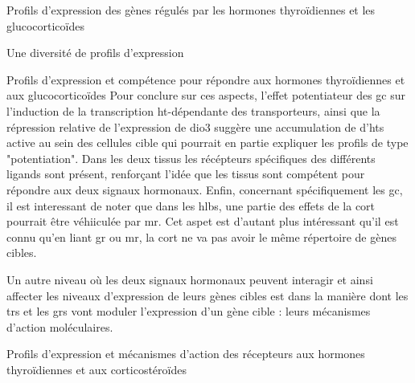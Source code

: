 \documentclass[../main.tex]{subfiles}
\begin{document}
\begin{chapter}{Profils d'expression des gènes régulés par les hormones thyroïdiennes et les glucocorticoïdes}
\begin{section}{Une diversité de profils d'expression}
\begin{subsection}{Profils d'expression et compétence pour répondre aux hormones thyroïdiennes et aux glucocorticoïdes}
Pour conclure sur ces aspects, l'effet potentiateur des \gls{gc} sur l'induction de la transcription \gls{ht}-dépendante des transporteurs, ainsi que la répression relative de l'expression de \gls{dio3} suggère une accumulation de d'\glspl{ht} active au sein des cellules cible qui pourrait en partie expliquer les profils de type "potentiation".
Dans les deux tissus les récépteurs spécifiques des différents ligands sont présent, renforçant l'idée que les tissus sont compétent pour répondre aux deux signaux hormonaux.
Enfin, concernant spécifiquement les \gls{gc}, il est interessant de noter que dans les \glspl{hlb}, une partie des effets de la \gls{cort} pourrait être véhiiculée par \gls{mr}.
Cet aspet est d'autant plus intéressant qu'il est connu qu'en liant \gls{gr} ou \gls{mr}, la \gls{cort} ne va pas avoir le même répertoire de gènes cibles.
\par
Un autre niveau où les deux signaux hormonaux peuvent interagir et ainsi affecter les niveaux d'expression de leurs gènes cibles est dans la manière dont les \glspl{tr} et les \glspl{gr} vont moduler l'expression d'un gène cible :
leurs mécanismes d'action moléculaires.
\end{subsection}

\end{section}


\begin{section}{Profils d'expression et mécanismes d'action des récepteurs aux hormones thyroïdiennes et aux corticostéroïdes}


\end{section}
\end{chapter}
\end{document}
